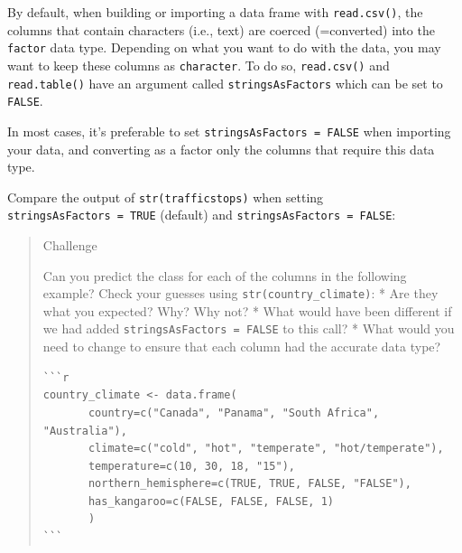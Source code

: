 \documentclass[]{book}
\newenvironment{Shaded}{\begin{snugshade}}{\end{snugshade}}
\newcommand{\KeywordTok}[1]{\textcolor[rgb]{0.13,0.29,0.53}{\textbf{#1}}}
\newcommand{\DataTypeTok}[1]{\textcolor[rgb]{0.13,0.29,0.53}{#1}}
\newcommand{\StringTok}[1]{\textcolor[rgb]{0.31,0.60,0.02}{#1}}
\newcommand{\OtherTok}[1]{\textcolor[rgb]{0.56,0.35,0.01}{#1}}
\newcommand{\OperatorTok}[1]{\textcolor[rgb]{0.81,0.36,0.00}{\textbf{#1}}}
\newcommand{\NormalTok}[1]{#1}
\theoremstyle{definition}
\theoremstyle{definition}
\theoremstyle{remark}
\begin{document}
By default, when building or importing a data frame with
\texttt{read.csv()}, the columns that contain characters (i.e., text)
are coerced (=converted) into the \texttt{factor} data type. Depending
on what you want to do with the data, you may want to keep these columns
as \texttt{character}. To do so, \texttt{read.csv()} and
\texttt{read.table()} have an argument called \texttt{stringsAsFactors}
which can be set to \texttt{FALSE}.

In most cases, it's preferable to set
\texttt{stringsAsFactors\ =\ FALSE} when importing your data, and
converting as a factor only the columns that require this data type.

Compare the output of \texttt{str(trafficstops)} when setting
\texttt{stringsAsFactors\ =\ TRUE} (default) and
\texttt{stringsAsFactors\ =\ FALSE}:

\begin{Shaded}
\end{Shaded}

\begin{quote}
Challenge

Can you predict the class for each of the columns in the following
example? Check your guesses using \texttt{str(country\_climate)}: * Are
they what you expected? Why? Why not? * What would have been different
if we had added \texttt{stringsAsFactors\ =\ FALSE} to this call? * What
would you need to change to ensure that each column had the accurate
data type?

\begin{verbatim}
```r
country_climate <- data.frame(
       country=c("Canada", "Panama", "South Africa", "Australia"),
       climate=c("cold", "hot", "temperate", "hot/temperate"),
       temperature=c(10, 30, 18, "15"),
       northern_hemisphere=c(TRUE, TRUE, FALSE, "FALSE"),
       has_kangaroo=c(FALSE, FALSE, FALSE, 1)
       )
```
\end{verbatim}
\end{quote}
\end{document}
